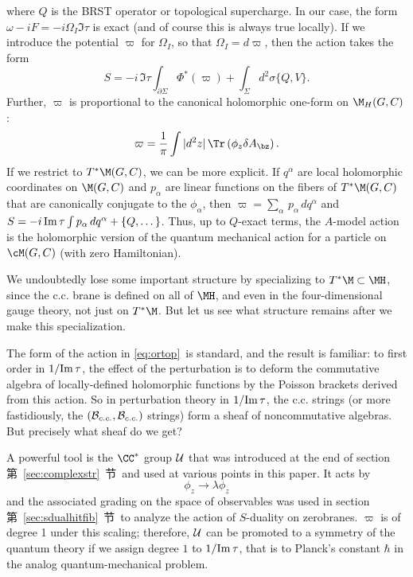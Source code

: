 where $Q$ is the BRST operator or topological supercharge. In our
case, the form $\omega-iF=-i \Omega_I \Im\tau$ is exact (and of
course this is always true locally). If we introduce the potential
$\varpi$ for $\Omega_I$, so that $\Omega_I=d\varpi$, then the
action takes the form %
\setcounter{equation}{8}
\begin{equation}\label{eq:ortop}
S=-i\,\Im\tau\int_{\partial\Sigma}\Phi^*(\varpi) +\int_\Sigma
d^2\sigma \{Q,V\}.
\end{equation}
 Further,  $\varpi$ is proportional to the
canonical holomorphic one-form on $\M_H(G,C)$: %
\setcounter{equation}{9}
\begin{equation}\label{eq:honop}
\varpi={1\over \pi}\int |d^2 z|\, \Tr \left(\phi_z\delta
A_\bz\right).
\end{equation}
  If we restrict to $T^*\M(G,C)$, we can be more
explicit.  If $q^\alpha$ are local holomorphic coordinates on
$\M(G,C)$ and $p_\alpha$ are linear functions on the fibers of
$T^*\M(G,C)$ that are canonically conjugate to the $\phi_\alpha$,
then $\varpi=\sum_\alpha \,p_\alpha\,dq^\alpha$ and $S=-i\,{\rm
Im}\,\tau\int p_\alpha\,dq^\alpha+\{Q,\dots\}$.  Thus, up to
$Q$-exact terms, the $A$-model action is the holomorphic version
of the quantum mechanical action for a particle on $\cM(G,C)$
(with zero Hamiltonian).

We undoubtedly lose some important structure by specializing to
$T^*\M\subset \MH$, since the c.c. brane is defined on all of
$\MH$, and even in the four-dimensional gauge theory, not just on
$T^*\M$.  But let us see what structure remains after we make this
specialization.

The form of the action in \eqref{eq:ortop}\ is standard, and the result is
familiar: to first order in ${1/ {\rm Im}\,\tau}$, the effect of
the perturbation is to deform the commutative algebra of
locally-defined holomorphic functions by the Poisson brackets
derived from this action.  So in perturbation theory in ${1/{\rm
Im}\,\tau}$, the c.c. strings (or more fastidiously, the $({\cal
B}_{c.c.},{\cal B}_{c.c.})$ strings) form a sheaf of
noncommutative algebras. But precisely what sheaf do we get?

A powerful tool is the $\CC^*$ group ${\cal U}$ that was
introduced at the end of section 第~\ref{sec:complexstr}~节\ and used at various
points in this paper. It acts by %
\setcounter{equation}{10}
\begin{equation}\label{eq:utyp}
\phi_z\to \lambda
\phi_z
\end{equation}
 and the associated grading on the space of observables was
used in section 第~\ref{sec:sdualhitfib}~节\ to analyze the action of $S$-duality
on zerobranes. $\varpi$ is of degree 1 under this scaling;
therefore,  ${\cal U}$ can be promoted to a symmetry of the
quantum theory if we assign degree $1$ to ${1/{\rm Im}\,\tau}$,
that is to Planck's constant $\hbar$ in the analog
quantum-mechanical problem.

